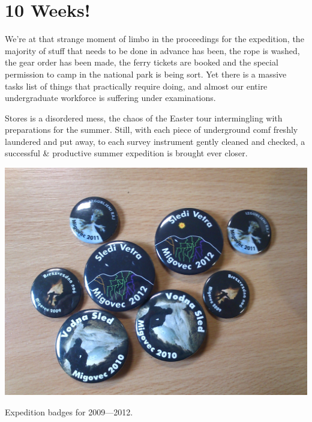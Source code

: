 \section{10 Weeks!}

We’re at that strange moment of limbo in the proceedings for the expedition, the majority of stuff that needs to be done in advance has been, the rope is washed, the gear order has been made, the ferry tickets are booked and the special permission to camp in the national park is being sort. Yet there is a massive tasks list of things that practically require doing, and almost our entire undergraduate workforce is suffering under examinations.


Stores is a disordered mess, the chaos of the Easter tour intermingling with preparations for the summer. Still, with each piece of underground comf freshly laundered and put away, to each survey instrument gently cleaned and checked, a successful \& productive summer expedition is brought ever closer.


\begin{pagefigure}
\checkoddpage \ifoddpage \forcerectofloat \else \forceversofloat \fi
   \centering
\includegraphics[width = \textwidth]{2012/10_weeks/2012-02-10-2045JarvistMooreFrost-DSC_0203--orig.jpg}
\caption{Expedition badges for 2009---2012. } \label{expo badges}
\end{pagefigure}

